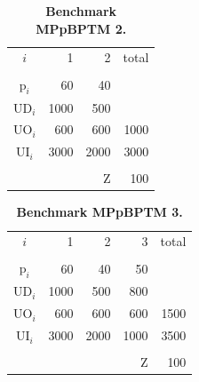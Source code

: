 \documentclass[10pt,fleqn,a4paper,twoside]{article}
\begin{document}
\begin{table}[ht]
\begin{center}
\caption{\textbf{Benchmark MPpBPTM 2.}}
\begin{tabular}[c]{c r r r}
\\
$i$ & 1 & 2 & total \\
\cline {1-4} \\
$\textrm{p}_i$ & 60 & 40 & \\
$\textrm{UD}_i$ & 1000 & 500 & \\
$\textrm{UO}_i$ & 600 & 600 & 1000 \\
$\textrm{UI}_i$ & 3000 & 2000 & 3000 \\
\cline {1-4} \\
& & $\textrm{Z}$ & 100 \\
\end{tabular}
\label{tab:MBPTMP001}
\end{center}
\end{table}

\begin{table}[ht]
\begin{center}
\caption{\textbf{Benchmark MPpBPTM 3.}}
\begin{tabular}[c]{c r r r r}
\\
$i$ & 1 & 2 & 3 & total \\
\cline {1-5} \\
$\textrm{p}_i$ & 60 & 40 & 50 \\
$\textrm{UD}_i$ & 1000 & 500 & 800 \\
$\textrm{UO}_i$ & 600 & 600 & 600 & 1500 \\
$\textrm{UI}_i$ & 3000 & 2000 & 1000 & 3500 \\
\cline {1-5} \\
& & & $\textrm{Z}$ & 100 \\
\end{tabular}
\label{tab:MBPTMP002}
\end{center}
\end{table}
\end{document}
